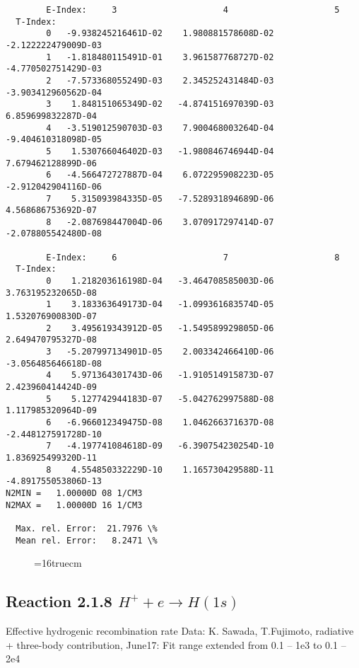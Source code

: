 \documentclass[12pt,dvipdfmx]{article}
\begin{document}
{\begin{small}
\begin{verbatim}
        E-Index:     3                     4                     5
  T-Index:
        0   -9.938245216461D-02    1.980881578608D-02   -2.122222479009D-03
        1   -1.818480115491D-01    3.961587768727D-02   -4.770502751429D-03
        2   -7.573368055249D-03    2.345252431484D-03   -3.903412960562D-04
        3    1.848151065349D-02   -4.874151697039D-03    6.859699832287D-04
        4   -3.519012590703D-03    7.900468003264D-04   -9.404610318098D-05
        5    1.530766046402D-03   -1.980846746944D-04    7.679462128899D-06
        6   -4.566472727887D-04    6.072295908223D-05   -2.912042904116D-06
        7    5.315093984335D-05   -7.528931894689D-06    4.568686753692D-07
        8   -2.087698447004D-06    3.070917297414D-07   -2.078805542480D-08

        E-Index:     6                     7                     8
  T-Index:
        0    1.218203616198D-04   -3.464708585003D-06    3.763195232065D-08
        1    3.183363649173D-04   -1.099361683574D-05    1.532076900830D-07
        2    3.495619343912D-05   -1.549589929805D-06    2.649470795327D-08
        3   -5.207997134901D-05    2.003342466410D-06   -3.056485646618D-08
        4    5.971364301743D-06   -1.910514915873D-07    2.423960414424D-09
        5    5.127742944183D-07   -5.042762997588D-08    1.117985320964D-09
        6   -6.966012349475D-08    1.046266371637D-08   -2.448127591728D-10
        7   -4.197741084618D-09   -6.390754230254D-10    1.836925499320D-11
        8    4.554850332229D-10    1.165730429588D-11   -4.891755053806D-13
N2MIN =   1.00000D 08 1/CM3
N2MAX =   1.00000D 16 1/CM3

  Max. rel. Error:  21.7976 \%
  Mean rel. Error:   8.2471 \%

\end{verbatim}\end{small}
\begin{figure} \label{2.1.8o}
\epsfxsize=16truecm
\end{figure}
\newpage

\subsection{
  Reaction 2.1.8 $ H^+ + e \rightarrow H(1s) $
}

   Effective hydrogenic recombination rate
   Data: K. Sawada, T.Fujimoto, radiative + three-body contribution, \cite{kn:Sawada}
   June17: Fit range extended from 0.1 -- 1e3 to 0.1 -- 2e4


\begin{small}\begin{verbatim}


\end{verbatim}
\end{small}}
\end{document}
